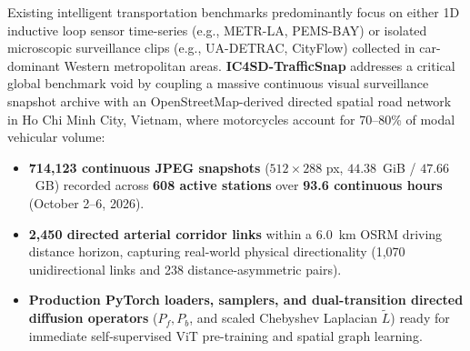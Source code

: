 \documentclass[10.5pt,a4paper]{article}
\begin{document}
Existing intelligent transportation benchmarks predominantly focus on either 1D inductive loop sensor time-series (e.g., METR-LA, PEMS-BAY) or isolated microscopic surveillance clips (e.g., UA-DETRAC, CityFlow) collected in car-dominant Western metropolitan areas. \textbf{IC4SD-TrafficSnap} addresses a critical global benchmark void by coupling a massive continuous visual surveillance snapshot archive with an OpenStreetMap-derived directed spatial road network in Ho Chi Minh City, Vietnam, where motorcycles account for 70--80\% of modal vehicular volume:
\begin{itemize}[noitemsep,topsep=2pt]
    \item \textbf{714,123 continuous JPEG snapshots} ($512 \times 288$ px, $44.38$~GiB / $47.66$~GB) recorded across \textbf{608 active stations} over \textbf{93.6 continuous hours} (October 2--6, 2026).
    \item \textbf{2,450 directed arterial corridor links} within a 6.0~km OSRM driving distance horizon, capturing real-world physical directionality (1,070 unidirectional links and 238 distance-asymmetric pairs).
    \item \textbf{Production PyTorch loaders, samplers, and dual-transition directed diffusion operators} ($P_f, P_b$, and scaled Chebyshev Laplacian $\tilde{L}$) ready for immediate self-supervised ViT pre-training and spatial graph learning.
\end{itemize}
\end{document}
